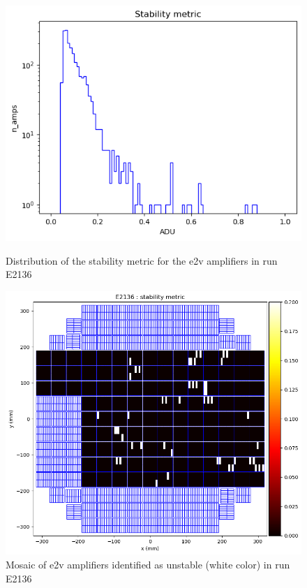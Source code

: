 \begin{figure}[htbp]
\centering
\begin{minipage}{0.45\textwidth}
    \centering
    \includegraphics[width=\textwidth]{figures/E2136_distribution_d.png}
    \caption{Distribution of the stability metric for the e2v amplifiers in run E2136}
    \label{fig:stability_dist}
\end{minipage}
\hfill
\begin{minipage}{0.45\textwidth}
    \centering
    \includegraphics[width=\textwidth]{figures/E2136_mosaic_d.png}
    \caption{Mosaic of e2v amplifiers identified as unstable (white color) in run E2136}
    \label{fig:stability_mosaic}
\end{minipage}
\end{figure}

